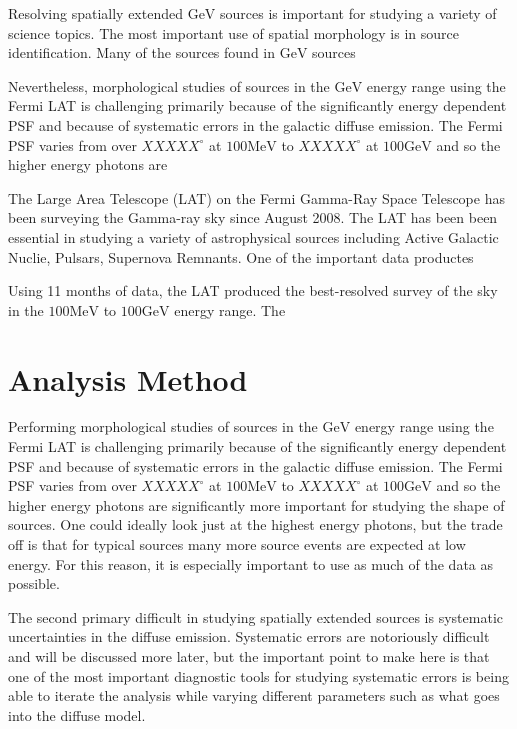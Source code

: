 \documentclass[preprint]{aastex}
\newcommand{\mev}{\text{MeV}}
\newcommand{\gev}{\text{GeV}}
\begin{document}
Resolving spatially extended $\gev$ sources is important for studying a
variety of science topics. The most important use of spatial morphology
is in source identification. Many of the sources found in $\gev$ sources

Nevertheless, morphological studies of sources in the $\gev$ energy range using
the Fermi LAT is challenging primarily because of the significantly energy
dependent PSF and because of systematic errors in the
galactic diffuse emission. The Fermi PSF varies from over $XXXXX^\circ$
at $100\mev$ to $XXXXX^\circ$ at $100\gev$ and so the higher energy photons are

The Large Area Telescope (LAT) on the Fermi Gamma-Ray Space Telescope
has been surveying the Gamma-ray sky since August 2008. The LAT has been
been essential in studying a variety of astrophysical sources including
Active Galactic Nuclie, Pulsars, Supernova Remnants. 
One of the important data productes 

Using 11 months of data, the LAT produced the best-resolved survey of the sky
in the $100\mev$ to $100\gev$ energy range\cite{2FGL Paper}. The


\section{Analysis Method}


%

Performing morphological studies of sources in the $\gev$ energy range using
the Fermi LAT is challenging primarily because of the significantly energy
dependent PSF and because of systematic errors in the
galactic diffuse emission. The Fermi PSF varies from over $XXXXX^\circ$
at $100\mev$ to $XXXXX^\circ$ at $100\gev$ and so the higher energy photons are
significantly more important for studying the shape of sources. One could
ideally look just at the highest energy photons, but the trade off is that
for typical sources many more source events are expected at low energy.
For this reason, it is especially important to use as much of the data
as possible.

The second primary difficult in studying spatially extended sources is
systematic uncertainties in the diffuse emission. Systematic errors are
notoriously difficult and will be discussed more later, but the important
point to make here is that one of the most important diagnostic tools for
studying systematic errors is being able to iterate the analysis while
varying different parameters such as what goes into the diffuse model.
\end{document}
